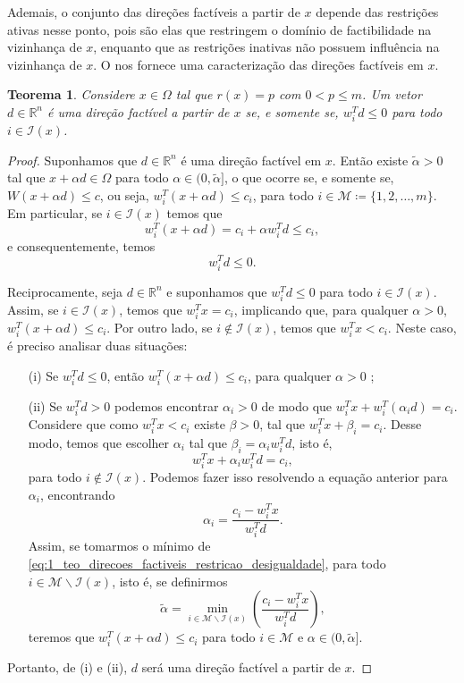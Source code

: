 \documentclass[12pt,a4paper]{scrartcl}
\def\RR{\mathds{R}}
\newtheorem{teo}{Teorema}
\theoremstyle{definition}%
\begin{document}
Ademais, o conjunto das direções factíveis a partir de $x$ depende das restrições ativas nesse ponto, pois são elas que restringem o domínio de factibilidade na vizinhança de $x$, enquanto que as restrições inativas não possuem influência na vizinhança de $x$.
O  nos fornece uma caracterização das direções factíveis em $x$.

\begin{teo} \label{teo:direcoes_factiveis_restricao_desigualdade}
Considere $x\in \Omega$ tal que $r(x) = p$ com $0<p \leq m$. Um vetor $d \in \RR^{n}$ é uma direção factível a partir de $x$ se, e somente se, $w_{i}^{T}d \leq 0$ para todo $i \in \mathcal{I} (x)$.
\end{teo}
\begin{proof}
Suponhamos que $d\in \RR^{n}$ é uma direção factível em $x$. Então existe $\tilde{\alpha} >0$ tal que $x+\alpha d \in \Omega$ para todo $\alpha \in (0, \tilde{\alpha} ]$, o que ocorre se, e somente se, $W(x+\alpha d) \leq c$, ou seja, $w_{i}^{T}(x+\alpha d) \leq c_{i}$, para todo $i \in \mathcal{M} \coloneqq \{ 1,2, \ldots ,m \}$. 
Em particular, se $i\in \mathcal{I} (x)$ temos que
\[
w_{i}^{T}(x+\alpha d) = c_{i} + \alpha w_{i}^{T}d \leq c_{i},
\]
e consequentemente, temos
\[
w_{i}^{T}d \leq 0.
\]

Reciprocamente, seja $d\in \RR^{n}$ e suponhamos que $w_{i}^{T}d \leq 0$ para todo $i \in \mathcal{I} (x)$. Assim, se $i \in \mathcal{I} (x)$, temos que $w_{i}^{T} x = c_{i}$, implicando que, para qualquer $\alpha >0$, $w_{i}^{T}(x+\alpha d) \leq c_{i}$.
Por outro lado, se $i \notin \mathcal{I}(x)$, temos que $w_{i}^{T} x < c_{i}$. Neste caso, é preciso analisar duas situações:
\begin{enumerate}
	\item[(i)] Se $w_{i}^{T}d \leq 0$, então $w_{i}^{T}(x + \alpha d) \leq c_{i}$, para qualquer $\alpha >0$             ;

	\item[(ii)]Se $w_{i}^{T}d >0$ podemos encontrar $\alpha_{i} >0$ de modo que $w_{i}^{T}x + w_{i}^{T}(\alpha_{i} d) = c_{i}$. Considere que como $w_{i}^{T}x < c_{i}$ existe $\beta >0$, tal que $w_{i}^{T}x + \beta_{i} = c_{i}$. Desse modo, temos que escolher $\alpha_{i}$ tal que $\beta_{i} = \alpha_{i} w_{i}^{T} d$, isto é,
	\[
	w_{i}^{T}x + \alpha_{i} w_{i}^{T}d = c_{i} ,
	\]
	para todo $i \notin \mathcal{I}(x)$. Podemos fazer isso resolvendo a equação anterior para $\alpha_{i}$, encontrando
	\[ \label{eq:1_teo_direcoes_factiveis_restricao_desigualdade}
	\alpha_{i} = \dfrac{c_{i} - w_{i}^{T}x}{w_{i}^{T}d}.
	\]
	Assim, se tomarmos o mínimo de \eqref{eq:1_teo_direcoes_factiveis_restricao_desigualdade}, para todo $i \in \mathcal{M} \backslash \mathcal{I}(x)$, isto é, se definirmos
	\[ \label{eq:2_teo_direcoes_factiveis_restricao_desigualdade}
	\tilde{\alpha} = \min_{i \in \mathcal{M} \backslash \mathcal{I}(x) } \left( \dfrac{c_{i} - w_{i}^{T}x}{w_{i}^{T}d} \right) ,
	\]
	teremos que $w_{i}^{T}(x + \alpha d) \leq c_{i}$ para todo $i \in \mathcal{M}$ e $\alpha \in (0,\tilde{\alpha} ]$. 
\end{enumerate}	
Portanto, de (i) e (ii), $d$ será uma direção factível a partir de $x$.
\end{proof}
\end{document}
